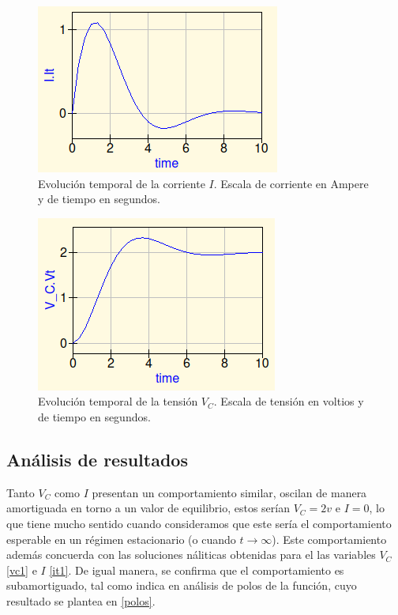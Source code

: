 \documentclass[letterpaper,12pt]{article} %
\begin{document}
\begin{figure}[h]
\includegraphics[scale=0.8]{ig.png}
\centering
\caption{Evolución temporal de la corriente $I$. Escala de corriente en Ampere y de tiempo en segundos.}
\label{fig:ig}
\end{figure} \newpage
\begin{figure}[h]
\includegraphics[scale=0.8]{vcg.png}
\centering
\caption{Evolución temporal de la tensión $V_C$. Escala de tensión en voltios y de tiempo en segundos.}
\label{fig:vcg}
\end{figure}

\subsection*{Análisis de resultados}

Tanto $V_C$ como $I$ presentan un comportamiento similar, oscilan de manera amortiguada en torno a un valor de equilibrio, estos serían $V_C=2v$ e $I=0$, lo que tiene mucho sentido cuando consideramos que este sería el comportamiento esperable en un régimen estacionario (o cuando $t \longrightarrow \infty$). Este comportamiento además concuerda con las soluciones náliticas obtenidas para el las variables $V_C$ \eqref{vc1} e $I$ \eqref{it1}. De igual manera, se confirma que el comportamiento es subamortiguado, tal como indica en análisis de polos de la función, cuyo resultado se plantea en \eqref{polos}.
\end{document}
